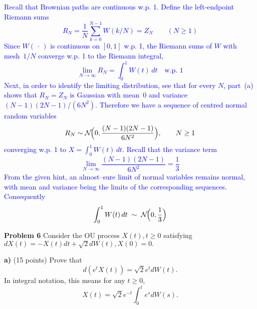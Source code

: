 \documentclass{article}
\begin{document}
\textcolor{blue}{
Recall that Brownian paths are continuous w.p. 1. Define the left‑endpoint Riemann sums  
$$
R_N=\frac1N\sum_{k=0}^{N-1}W(k/N)=Z_N\qquad(N\ge1)
$$
Since $W(\,\cdot\,)$ is continuous on $[0,1]$ w.p. 1, the Riemann sums of $W$ with mesh $1/N$ converge w.p. 1 to the Riemann integral,
$$
\lim_{N\to\infty}R_N=\int_{0}^{1}W(t)\,dt\quad\text{w.p. 1}
$$
Next, in order to identify the limiting distribution, see that 
for every $N$, part (a) shows that $R_N=Z_N$ is Gaussian with mean $0$ and variance $(N-1)(2N-1)/(6N^{2})$.  Therefore we have a sequence of centred normal random variables
$$
R_N\sim\mathcal{N}\!\Bigl(0,\frac{(N-1)(2N-1)}{6N^{2}}\Bigr),\qquad N\ge1
$$
converging w.p. 1 to $X=\displaystyle\int_{0}^{1}W(t)\,dt$. Recall that the variance term
$$
\lim_{N\to\infty}\frac{(N-1)(2N-1)}{6N^{2}}=\frac13
$$
From the given hint, an almost–sure limit of normal variables remains normal, with mean and variance being the limits of the corresponding sequences.  Consequently
$$
\int_{0}^{1}W(t)\,dt\;\sim\;\mathcal{N}\!\Bigl(0,\frac13\Bigr)
$$
}



\textbf{Problem 6}   Consider the OU process $X(t), t \geq 0$ satisfying 
$dX(t) = -X(t)dt + \sqrt{2}dW(t),   X(0) = 0.$

\textbf{a)}   (15 points) Prove that 
$$d(e^t X(t)) = \sqrt{2}e^t dW(t).$$
In integral notation, this means for any $t \geq 0$,
$$X(t) = \sqrt{2}e^{-t} \int_0^t e^s dW(s).$$
\end{document}
